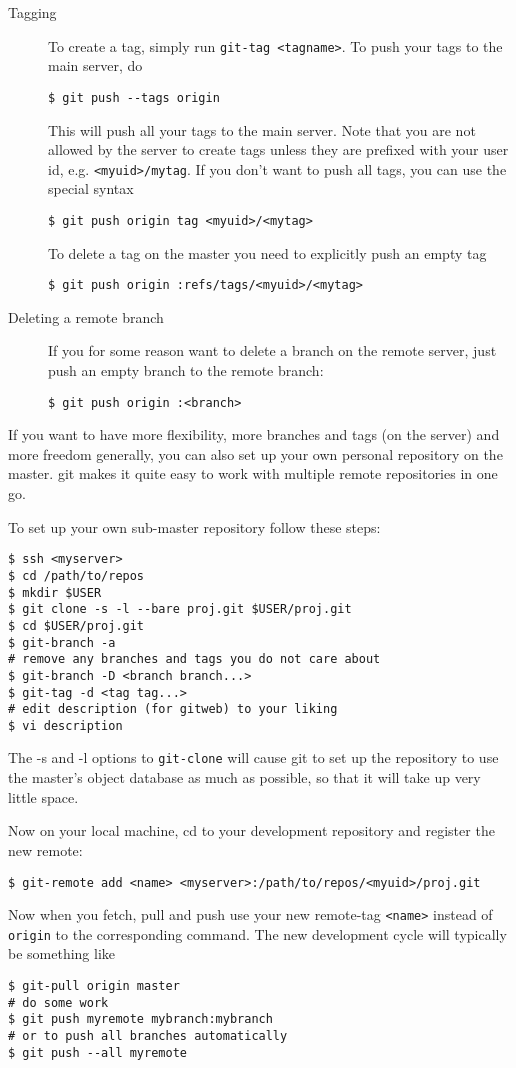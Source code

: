 \documentclass[a4paper,10pt]{article}
\begin{document}
\begin{description}
\item[Tagging] To create a tag, simply run {\tt git-tag <tagname>}. To push
your tags to the main server, do
\begin{verbatim}
$ git push --tags origin 
\end{verbatim}
This will push all your tags to the main server. Note that you are not allowed
by the server to create tags unless they are prefixed with your user id, e.g. 
{\tt <myuid>/mytag}. If you don't want to push all tags, you can use the special
syntax
\begin{verbatim}
$ git push origin tag <myuid>/<mytag>
\end{verbatim}
To delete a tag on the master you need to explicitly push an empty tag
\begin{verbatim}
$ git push origin :refs/tags/<myuid>/<mytag>
\end{verbatim}

\item[Deleting a remote branch] If you for some reason want to delete a branch
on the remote server, just push an empty branch to the remote branch:
\begin{verbatim}
$ git push origin :<branch>
\end{verbatim}
\end{description}

If you want to have more
flexibility, more branches and tags (on the server) and more freedom
generally, you can also set up your own personal repository on the master. git
makes it quite easy to work with multiple remote repositories in one go. 

To set up your own sub-master repository follow these steps:
\begin{verbatim}
$ ssh <myserver>
$ cd /path/to/repos
$ mkdir $USER
$ git clone -s -l --bare proj.git $USER/proj.git
$ cd $USER/proj.git 
$ git-branch -a 
# remove any branches and tags you do not care about
$ git-branch -D <branch branch...>
$ git-tag -d <tag tag...>
# edit description (for gitweb) to your liking 
$ vi description
\end{verbatim}
The -s and -l options to {\tt git-clone} will cause git to set up the
repository to use the master's object database as much as possible, so that it
will take up very little space. 

Now on your local machine, cd to your development repository and register the 
new remote:
\begin{verbatim}
$ git-remote add <name> <myserver>:/path/to/repos/<myuid>/proj.git
\end{verbatim}
Now when you fetch, pull and push use your new remote-tag {\tt <name>} instead 
of {\tt origin} to the corresponding command. The new development cycle will
typically be something like
\begin{verbatim}
$ git-pull origin master
# do some work
$ git push myremote mybranch:mybranch
# or to push all branches automatically
$ git push --all myremote 
\end{verbatim}
\end{document}
